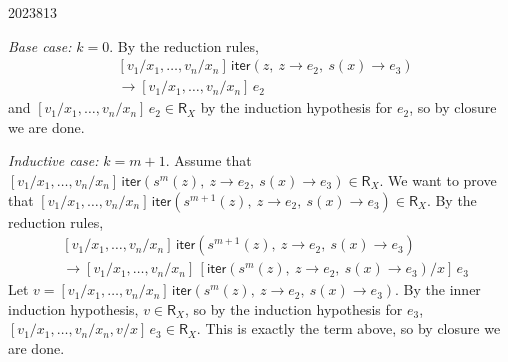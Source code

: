 \documentclass[10pt,\jkfside,a4paper]{article}
\begin{document}
\begin{examquestion}{2023}{8}{13}
\begin{enumerate}
{                \textit{Base case:} $k = 0$. By the reduction rules,
                \begin{align*}
                    & [v_1/x_1, \ldots, v_n/x_n]\,\mathsf{iter}(z,\ z \to e_2,\ s(x) \to e_3) \\
                    &\to [v_1/x_1, \ldots, v_n/x_n]\,e_2
                \end{align*}
                and $[v_1/x_1, \ldots, v_n/x_n]\,e_2 \in \mathsf{R}_X$ by the induction hypothesis for $e_2$, so by closure we are done.

                \textit{Inductive case:} $k = m + 1$. Assume that $[v_1/x_1, \ldots, v_n/x_n]\,\mathsf{iter}(s^m(z),\ z \to e_2,\ s(x) \to e_3) \in \mathsf{R}_X$.
                We want to prove that $[v_1/x_1, \ldots, v_n/x_n]\,\mathsf{iter}(s^{m+1}(z),\ z \to e_2,\ s(x) \to e_3) \in \mathsf{R}_X$. By the reduction rules,
                \begin{align*}
                    & [v_1/x_1, \ldots, v_n/x_n]\,\mathsf{iter}(s^{m+1}(z),\ z \to e_2,\ s(x) \to e_3) \\
                    &\to [v_1/x_1, \ldots, v_n/x_n]\,[\mathsf{iter}(s^m(z),\ z \to e_2,\ s(x) \to e_3)/x]\,e_3
                \end{align*}
                Let $v = [v_1/x_1, \ldots, v_n/x_n]\,\mathsf{iter}(s^m(z),\ z \to e_2,\ s(x) \to e_3)$. By the inner induction hypothesis, $v \in \mathsf{R}_X$, so by the induction hypothesis for $e_3$, $[v_1/x_1, \ldots, v_n/x_n, v/x]\,e_3 \in \mathsf{R}_X$. This is exactly the term above, so by closure we are done.
            }

    \end{enumerate}

\end{examquestion}
\end{document}
